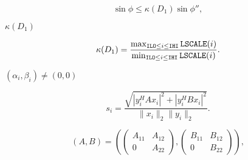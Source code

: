 {\newpage\clearpage
{}%
\begin{displaymath}
\sin \phi \leq \kappa(D_1) \sin \phi'',
\end{displaymath}%
\lthtmldisplayZ
\lthtmlcheckvsize\clearpage}

{\newpage\clearpage
{}%
$\kappa(D_1)$%
\lthtmlinlinemathZ
\lthtmlcheckvsize\clearpage}

{\newpage\clearpage
{}%
\begin{displaymath}
\kappa(D_1)=\frac{ \max_{ {\tt ILO} \leq i \leq {\tt IHI} } {\tt LSCALE}(i) }
                 { \min_{ {\tt ILO} \leq i \leq {\tt IHI} } {\tt LSCALE}(i) }.
\end{displaymath}%
\lthtmldisplayZ
\lthtmlcheckvsize\clearpage}

{\newpage\clearpage
{}%
$(\alpha_i, \beta_i) \neq (0, 0)$%
\lthtmlinlinemathZ
\lthtmlcheckvsize\clearpage}

{\newpage\clearpage
{}%
\begin{displaymath}
s_i = \frac{\sqrt{|y^H_iAx_i|^2 + |y^H_iBx_i|^2}}{\|x_i\|_2\|y_i\|_2}.
\end{displaymath}%
\lthtmldisplayZ
\lthtmlcheckvsize\clearpage}

{\newpage\clearpage
{}%
\begin{displaymath}
(A, B) = \left(
\left( \begin{array}{cc}  A_{11} & A_{12} \\0  & A_{22} \end{array} \right) ,
\left( \begin{array}{cc}  B_{11} & B_{12} \\0  & B_{22} \end{array} \right) 
\right) ,
\end{displaymath}%
\lthtmldisplayZ
\lthtmlcheckvsize\clearpage}

